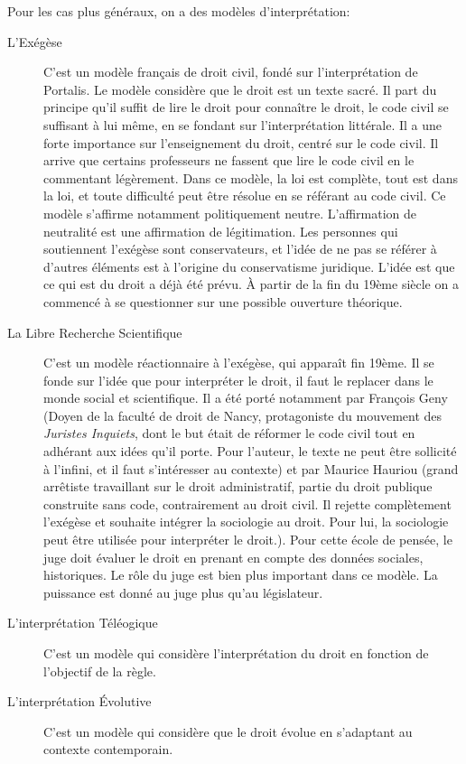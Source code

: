 \documentclass[math]{cours}
\begin{document}
Pour les cas plus généraux, on a des modèles d'interprétation:
\begin{description}
	\item[L'Exégèse] C'est un modèle français de droit civil, fondé sur l'interprétation de Portalis.
	      Le modèle considère que le droit est un texte sacré.
	      Il part du principe qu'il suffit de lire le droit pour connaître le droit, le code civil se suffisant à lui même, en se fondant sur l'interprétation littérale.
	      Il a une forte importance sur l'enseignement du droit, centré sur le code civil.
	      Il arrive que certains professeurs ne fassent que lire le code civil en le commentant légèrement.
	      Dans ce modèle, la loi est complète, tout est dans la loi, et toute difficulté peut être résolue en se référant au code civil.
	      Ce modèle s'affirme notamment politiquement neutre.
	      L'affirmation de neutralité est une affirmation de légitimation.
	      Les personnes qui soutiennent l'exégèse sont conservateurs, et l'idée de ne pas se référer à d'autres éléments est à l'origine du conservatisme juridique.
	      L'idée est que ce qui est du droit a déjà été prévu.
	      À partir de la fin du 19ème siècle on a commencé à se questionner sur une possible ouverture théorique.
	\item[La Libre Recherche Scientifique] C'est un modèle réactionnaire à l'exégèse, qui apparaît fin 19ème.
	      Il se fonde sur l'idée que pour interpréter le droit, il faut le replacer dans le monde social et scientifique.
	      Il a été porté notamment par François Geny (Doyen de la faculté de droit de Nancy, protagoniste du mouvement des \emph{Juristes Inquiets}, dont le but était de réformer le code civil tout en adhérant aux idées qu'il porte.
	      Pour l'auteur, le texte ne peut être sollicité à l'infini, et il faut s'intéresser au contexte)
	      et par Maurice Hauriou (grand arrêtiste travaillant sur le droit administratif, partie du droit publique construite sans code, contrairement au droit civil.
	      Il rejette complètement l'exégèse et souhaite intégrer la sociologie au droit. Pour lui, la sociologie peut être utilisée pour interpréter le droit.).
	      Pour cette école de pensée, le juge doit évaluer le droit en prenant en compte des données sociales, historiques.
	      Le rôle du juge est bien plus important dans ce modèle.
	      La puissance est donné au juge plus qu'au législateur.
	\item[L'interprétation Téléogique] C'est un modèle qui considère l'interprétation du droit en fonction de l'objectif de la règle.
	\item[L'interprétation Évolutive] C'est un modèle qui considère que le droit évolue en s'adaptant au contexte contemporain.
\end{description}
\end{document}

